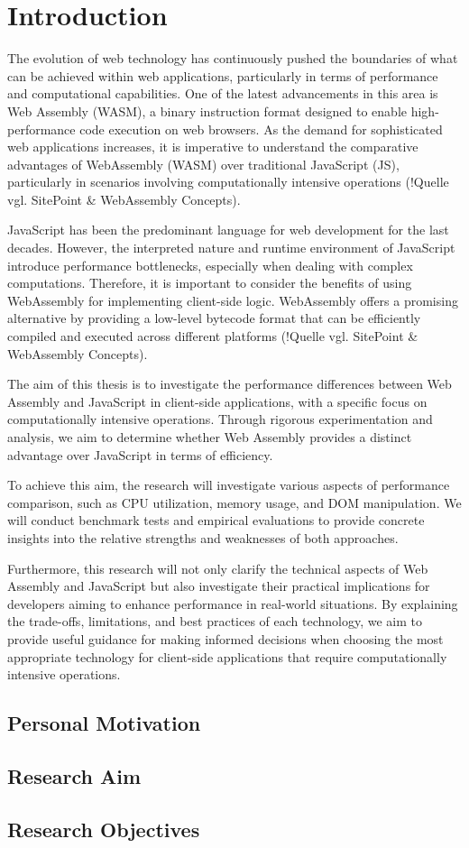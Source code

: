 \newpage

\section{Introduction} \label{introduction}
The evolution of web technology has continuously pushed the boundaries of what can be achieved within web applications, particularly in terms of performance and computational capabilities. One of the latest advancements in this area is Web Assembly (WASM), a binary instruction format designed to enable high-performance code execution on web browsers. As the demand for sophisticated web applications increases, it is imperative to understand the comparative advantages of WebAssembly (WASM) over traditional JavaScript (JS), particularly in scenarios involving computationally intensive operations (!Quelle vgl. SitePoint \& WebAssembly Concepts).

JavaScript has been the predominant language for web development for the last decades. However, the interpreted nature and runtime environment of JavaScript introduce performance bottlenecks, especially when dealing with complex computations. Therefore, it is important to consider the benefits of using WebAssembly for implementing client-side logic. WebAssembly offers a promising alternative by providing a low-level bytecode format that can be efficiently compiled and executed across different platforms (!Quelle vgl. SitePoint \& WebAssembly Concepts).

The aim of this thesis is to investigate the performance differences between Web Assembly and JavaScript in client-side applications, with a specific focus on computationally intensive operations. Through rigorous experimentation and analysis, we aim to determine whether Web Assembly provides a distinct advantage over JavaScript in terms of efficiency.

To achieve this aim, the research will investigate various aspects of performance comparison, such as CPU utilization, memory usage, and DOM manipulation. We will conduct benchmark tests and empirical evaluations to provide concrete insights into the relative strengths and weaknesses of both approaches.

Furthermore, this research will not only clarify the technical aspects of Web Assembly and JavaScript but also investigate their practical implications for developers aiming to enhance performance in real-world situations. By explaining the trade-offs, limitations, and best practices of each technology, we aim to provide useful guidance for making informed decisions when choosing the most appropriate technology for client-side applications that require computationally intensive operations.

\subsection{Personal Motivation} \label{motivation}

\subsection{Research Aim} \label{aim}

\subsection{Research Objectives} \label{objectives}

